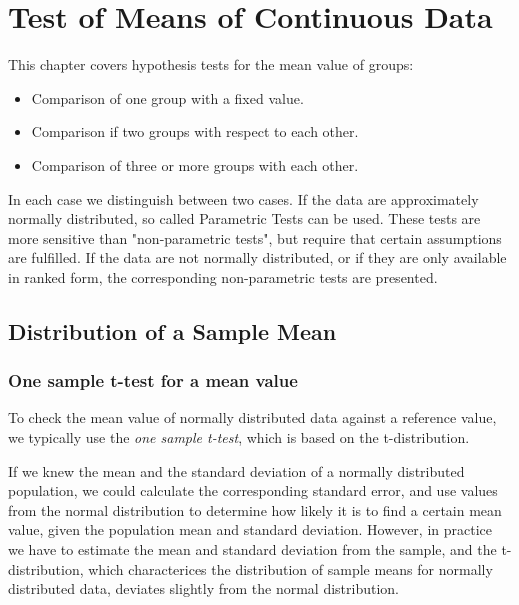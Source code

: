 \chapter{Test of Means of Continuous Data}

This chapter covers hypothesis tests for the mean value of groups:

\begin{itemize}
  \item Comparison of one group with a fixed value.
  \item Comparison if two groups with respect to each other.
  \item Comparison of three or more groups with each other.
\end{itemize}

In each case we distinguish between two cases. If the data are approximately normally distributed, so called Parametric Tests can be used. These tests are more sensitive than "non-parametric tests", but require that certain assumptions are fulfilled. If the data are not normally distributed, or if they are only available in ranked form, the corresponding non-parametric tests are presented.

\section{Distribution of a Sample Mean}

\subsection{One sample t-test for a mean value} 

To check the mean value of normally distributed data against a reference value, we typically use the \emph{one sample t-test}, which is based on the t-distribution.

If we knew the mean and the standard deviation of a normally distributed population, we could calculate the corresponding standard error, and use values from the normal distribution to determine how likely it is to find a certain mean value, given the population mean and standard deviation. However, in practice we have to estimate the mean and standard deviation from the sample, and the t-distribution, which characterices the distribution of sample means for normally distributed data, deviates slightly from the normal distribution.

